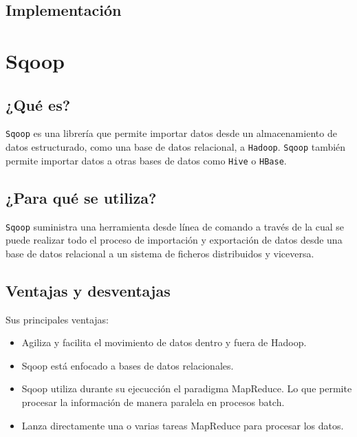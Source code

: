 \documentclass[]{article}
\begin{document}
\subsection{Implementación}\label{implementacion-2}

\section{Sqoop}\label{sqoop}

\subsection{¿Qué es?}\label{que-es-2}

\texttt{Sqoop} es una librería que permite importar datos desde un
almacenamiento de datos estructurado, como una base de datos relacional,
a \texttt{Hadoop}. \texttt{Sqoop} también permite importar datos a otras
bases de datos como \texttt{Hive} o \texttt{HBase}.

\subsection{¿Para qué se utiliza?}\label{para-que-se-utiliza-2}

\texttt{Sqoop} suministra una herramienta desde línea de comando a
través de la cual se puede realizar todo el proceso de importación y
exportación de datos desde una base de datos relacional a un sistema de
ficheros distribuidos y viceversa.

\subsection{Ventajas y desventajas}\label{ventajas-y-desventajas-2}

Sus principales ventajas:

\begin{itemize}
\itemsep1pt\parskip0pt
\item
  Agiliza y facilita el movimiento de datos dentro y fuera de Hadoop.
\item
  Sqoop está enfocado a bases de datos relacionales.
\item
  Sqoop utiliza durante su ejecucción el paradigma MapReduce. Lo que
  permite procesar la información de manera paralela en procesos batch.
\item
  Lanza directamente una o varias tareas MapReduce para procesar los
  datos.
\end{itemize}
\end{document}
